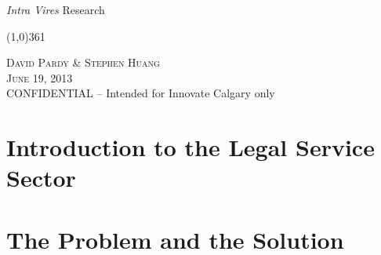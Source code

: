 \documentclass[11pt]{article}
\begin{document}
\setlength{\parindent}{1cm}

\frenchspacing

\begin{center}
\Huge
\emph{Intra Vires} Research
\end{center}
 \normalsize

\begin{center}
\vspace{-0.5in}
\line(1,0){361}


\normalsize
\textsc{David Pardy \& Stephen Huang}\\
\textsc{June 19, 2013}\\
CONFIDENTIAL -- Intended for Innovate Calgary only
\end{center}

\section*{Introduction to the Legal Service Sector}







\section*{The Problem and the Solution}
\end{document}
